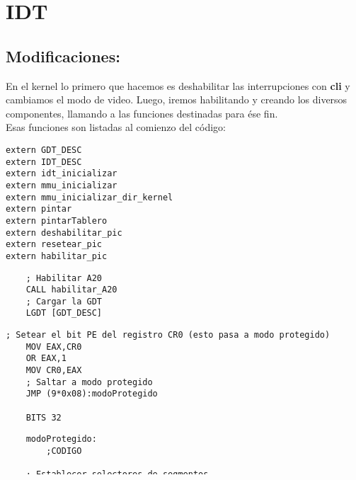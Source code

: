
\section{IDT}
\subsection{Modificaciones:}

En el kernel lo primero que hacemos es deshabilitar las interrupciones con \textbf{cli} y cambiamos el modo de video. 
Luego, iremos habilitando y creando los diversos componentes, llamando a las funciones destinadas para \'ese fin.
\\
Esas funciones son listadas al comienzo del c\'odigo:

\begin{codesnippet}
\begin{verbatim}
extern GDT_DESC
extern IDT_DESC 
extern idt_inicializar
extern mmu_inicializar
extern mmu_inicializar_dir_kernel
extern pintar
extern pintarTablero
extern deshabilitar_pic
extern resetear_pic
extern habilitar_pic
\end{verbatim}
\end{codesnippet}

\begin{codesnippet}
\begin{verbatim}
    ; Habilitar A20
    CALL habilitar_A20
    ; Cargar la GDT
    LGDT [GDT_DESC]
\end{verbatim}
\end{codesnippet}

\begin{codesnippet}
\begin{verbatim}
; Setear el bit PE del registro CR0 (esto pasa a modo protegido)
    MOV EAX,CR0
    OR EAX,1
    MOV CR0,EAX
    ; Saltar a modo protegido
    JMP (9*0x08):modoProtegido

    BITS 32
\end{verbatim}
\end{codesnippet}

\begin{codesnippet}
\begin{verbatim}
    modoProtegido:
        ;CODIGO
        
    ; Establecer selectores de segmentos
    XOR EAX, EAX
    MOV AX, 1011000b ;1011b == 11d (index de la GDT) | 0 (0 -> GDT / 1 -> LDT) | 00 (NIVEL DE PRIVILEGIO)
    MOV DS, AX
    MOV ES, AX
    MOV GS, AX
    MOV SS, AX
    MOV AX, 1101000b
    MOV FS, AX
    ; Establecer la base de la pila
    MOV ESP, 0x27000
    MOV EBP, ESP
    CALL pintar
    CALL idt_inicializar
	LIDT [IDT_DESC]

    xor eax, eax
    xor edi, edi
    div edi	
	CALL pintarTablero
\end{verbatim}
\end{codesnippet}

